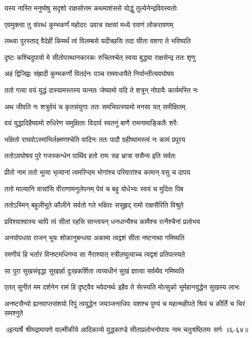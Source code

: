 \twolineshloka
{यस्य नास्ति मनुष्येषु सदृशो राक्षसोत्तम}
{कथमाशंससे योद्धुं तुल्येनेन्द्रविवस्वतोः} %

\twolineshloka
{एवमुक्त्वा तु संरब्धं कुम्भकर्णं महोदरः}
{उवाच रक्षसां मध्ये रावणं लोकरावणम्} %

\twolineshloka
{लब्ध्वा पुरस्ताद् वैदेहीं किमर्थं त्वं विलम्बसे}
{यदीच्छसि तदा सीता वशगा ते भविष्यति} %

\twolineshloka
{दृष्टः कश्चिदुपायो मे सीतोपस्थानकारकः}
{रुचितश्चेत् स्वया बुद्ध्या राक्षसेन्द्र ततः शृणु} %

\twolineshloka
{अहं द्विजिह्वः संह्रादी कुम्भकर्णो वितर्दनः}
{पञ्च रामवधायैते निर्यान्तीत्यवघोषय} %

\twolineshloka
{ततो गत्वा वयं युद्धं दास्यामस्तस्य यत्नतः}
{जेष्यामो यदि ते शत्रून् नोपायैः कार्यमस्ति नः} %

\twolineshloka
{अथ जीवति नः शत्रुर्वयं च कृतसंयुगाः}
{ततः समभिपत्स्यामो मनसा यत् समीक्षितम्} %

\twolineshloka
{वयं युद्धादिहैष्यामो रुधिरेण समुक्षिताः}
{विदार्य स्वतनुं बाणै रामनामाङ्कितैः शरैः} %

\twolineshloka
{भक्षितो राघवोऽस्माभिर्लक्ष्मणश्चेति वादिनः}
{ततः पादौ ग्रहीष्यामस्त्वं नः कामं प्रपूरय} %

\twolineshloka
{ततोऽवघोषय पुरे गजस्कन्धेन पार्थिव}
{हतो रामः सह भ्रात्रा ससैन्य इति सर्वतः} %

\twolineshloka
{प्रीतो नाम ततो भूत्वा भृत्यानां त्वमरिन्दम}
{भोगांश्च परिवारांश्च कामान् वसु च दापय} %

\twolineshloka
{ततो माल्यानि वासांसि वीराणामनुलेपनम्}
{पेयं च बहु योधेभ्यः स्वयं च मुदितः पिब} %

\twolineshloka
{ततोऽस्मिन् बहुलीभूते कौलीने सर्वतो गते}
{भक्षितः ससुहृद् रामो राक्षसैरिति विश्रुते} %

\twolineshloka
{प्रविश्याश्वास्य चापि त्वं सीतां रहसि सान्त्वयन्}
{धनधान्यैश्च कामैश्च रत्नैश्चैनां प्रलोभय} %

\twolineshloka
{अनयोपधया राजन् भूयः शोकानुबन्धया}
{अकामा त्वद्वशं सीता नष्टनाथा गमिष्यति} %

\twolineshloka
{रमणीयं हि भर्तारं विनष्टमधिगम्य सा}
{नैराश्यात् स्त्रीलघुत्वाच्च त्वद्वशं प्रतिपत्स्यते} %

\twolineshloka
{सा पुरा सुखसंवृद्धा सुखार्हा दुःखकर्शिता}
{त्वय्यधीनं सुखं ज्ञात्वा सर्वथैव गमिष्यति} %

\twolineshloka
{एतत् सुनीतं मम दर्शनेन रामं हि दृष्ट्वैव भवेदनर्थः}
{इहैव ते सेत्स्यति मोत्सुको भूर्महानयुद्धेन सुखस्य लाभः} %

\twolineshloka
{अनष्टसैन्यो ह्यनवाप्तसंशयो रिपुं त्वयुद्धेन जयञ्जनाधिपः}
{यशश्च पुण्यं च महान्महीपते श्रियं च कीर्तिं च चिरं समश्नुते} %


॥इत्यार्षे श्रीमद्रामायणे वाल्मीकीये आदिकाव्ये युद्धकाण्डे सीताप्रलोभनोपायः नाम चतुःषष्ठितमः सर्गः ॥६-६४॥
